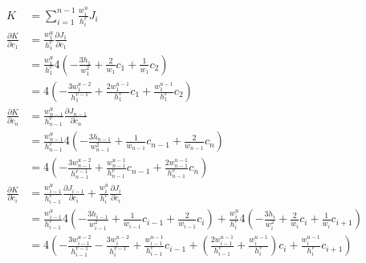\documentclass{article}
\begin{document}
\begin{align*}
  K &= \sum_{i=1}^{n-1}\frac{w_i^u}{h_i^v}J_i \\
  \frac{\partial K}{\partial c_1}
  &= \frac{w_1^u}{h_1^v}\frac{\partial J_1}{\partial c_1} \\
  &= \frac{w_1^u}{h_1^v}4\left(-\frac{3h_1}{w_1^2}+\frac{2}{w_1}c_1+\frac{1}{w_1}c_2\right) \\
  &= 4\left(-\frac{3w_1^{u-2}}{h_1^{v-1}}+\frac{2w_1^{u-1}}{h_1^v}c_1+\frac{w_1^{u-1}}{h_1^v}c_2\right) \\
  \frac{\partial K}{\partial c_n}
  &= \frac{w_{n-1}^u}{h_{n-1}^v}\frac{\partial J_{n-1}}{\partial c_n} \\
  &= \frac{w_{n-1}^u}{h_{n-1}^v}4\left(-\frac{3h_{n-1}}{w_{n-1}^2}+\frac{1}{w_{n-1}}c_{n-1}+\frac{2}{w_{n-1}}c_n\right) \\
  &= 4\left(-\frac{3w_{n-1}^{u-2}}{h_{n-1}^{v-1}}+\frac{w_{n-1}^{u-1}}{h_{n-1}^v}c_{n-1}+\frac{2w_{n-1}^{u-1}}{h_{n-1}^v}c_n\right) \\
  \frac{\partial K}{\partial c_i}
  &= \frac{w_{i-1}^u}{h_{i-1}^v}\frac{\partial J_{i-1}}{\partial c_i}
  + \frac{w_i^u}{h_i^v}\frac{\partial J_i}{\partial c_i} \\
  &= \frac{w_{i-1}^u}{h_{i-1}^v}4\left(-\frac{3h_{i-1}}{w_{i-1}^2}+\frac{1}{w_{i-1}}c_{i-1}+\frac{2}{w_{i-1}}c_i\right)
  + \frac{w_i^u}{h_i^v}4\left(-\frac{3h_i}{w_i^2}+\frac{2}{w_i}c_i+\frac{1}{w_i}c_{i+1}\right) \\
  &= 4\left(
  -\frac{3w_{i-1}^{u-2}}{h_{i-1}^{v-1}}-\frac{3w_i^{u-2}}{h_i^{v-1}}
  +\frac{w_{i-1}^{u-1}}{h_{i-1}^v}c_{i-1}
  +\left(\frac{2w_{i-1}^{u-1}}{h_{i-1}^v}+\frac{w_i^{u-1}}{h_i^v}\right)c_i
  +\frac{w_i^{u-1}}{h_i^v}c_{i+1}
  \right)
\end{align*}
\end{document}
